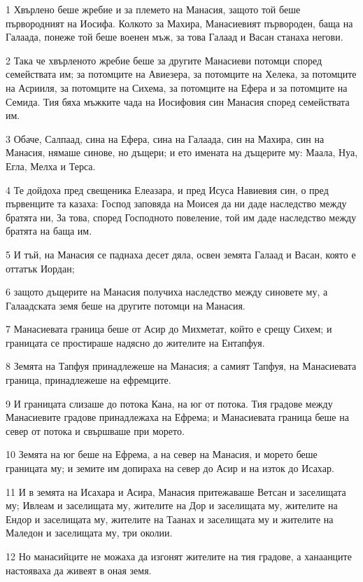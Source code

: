\par 1 Хвърлено беше жребие и за племето на Манасия, защото той беше първородният на Иосифа. Колкото за Махира, Манасиевият първороден, баща на Галаада, понеже той беше военен мъж, за това Галаад и Васан станаха негови.
\par 2 Така че хвърленото жребие беше за другите Манасиеви потомци според семействата им; за потомците на Авиезера, за потомците на Хелека, за потомците на Асрииля, за потомците на Сихема, за потомците на Ефера и за потомците на Семида. Тия бяха мъжките чада на Иосифовия син Манасия според семействата им.
\par 3 Обаче, Салпаад, сина на Ефера, сина на Галаада, син на Махира, син на Манасия, нямаше синове, но дъщери; и ето имената на дъщерите му: Маала, Нуа, Егла, Мелха и Терса.
\par 4 Те дойдоха пред свещеника Елеазара, и пред Исуса Навиевия син, о пред първенците та казаха: Господ заповяда на Моисея да ни даде наследство между братята ни, За това, според Господното повеление, той им даде наследство между братята на баща им.
\par 5 И тъй, на Манасия се паднаха десет дяла, освен земята Галаад и Васан, която е оттатък Иордан;
\par 6 защото дъщерите на Манасия получиха наследство между синовете му, а Галаадската земя беше на другите потомци на Манасия.
\par 7 Манасиевата граница беше от Асир до Михметат, който е срещу Сихем; и границата се простираше надясно до жителите на Ентапфуя.
\par 8 Земята на Тапфуя принадлежеше на Манасия; а самият Тапфуя, на Манасиевата граница, принадлежеше на ефремците.
\par 9 И границата слизаше до потока Кана, на юг от потока. Тия градове между Манасиевите градове принадлежаха на Ефрема; и Манасиевата граница беше на север от потока и свършваше при морето.
\par 10 Земята на юг беше на Ефрема, а на север на Манасия, и морето беше границата му; и земите им допираха на север до Асир и на изток до Исахар.
\par 11 И в земята на Исахара и Асира, Манасия притежаваше Ветсан и заселищата му; Ивлеам и заселищата му, жителите на Дор и заселищата му, жителите на Ендор и заселищата му, жителите на Таанах и заселищата му и жителите на Маледон и заселищата му, три околии.
\par 12 Но манасийците не можаха да изгонят жителите на тия градове, а ханаанците настояваха да живеят в оная земя.
